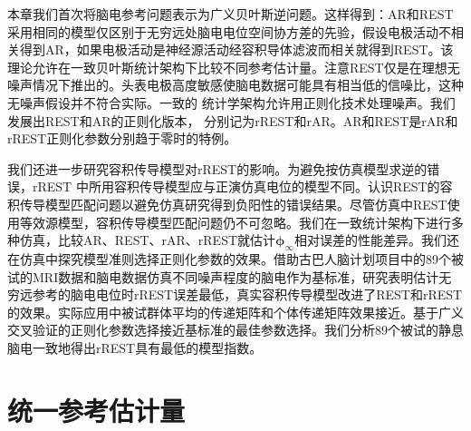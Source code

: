 本章我们首次将脑电参考问题表示为广义贝叶斯逆问题。这样得到：AR和REST采用相同的模型仅区别于无穷远处脑电电位空间协方差的先验，假设电极活动不相关得到AR，如果电极活动是神经源活动经容积导体滤波而相关就得到REST。该理论允许在一致贝叶斯统计架构下比较不同参考估计量。注意REST仅是在理想无噪声情况下推出的。头表电极高度敏感使脑电数据可能具有相当低的信噪比，这种无噪声假设并不符合实际。一致的
统计学架构允许用正则化技术处理噪声。我们发展出REST和AR的正则化版本，
分别记为rREST和rAR。AR和REST是rAR和rREST正则化参数分别趋于零时的特例。

我们还进一步研究容积传导模型对rREST的影响。为避免按仿真模型求逆的错误，rREST
中所用容积传导模型应与正演仿真电位的模型不同。认识REST的容积传导模型匹配问题以避免仿真研究得到负阳性的错误结果。尽管仿真中REST使用等效源模型，容积传导模型匹配问题仍不可忽略。我们在一致统计架构下进行多种仿真，比较AR、REST、rAR、rREST就估计$\mathbf{\phi}_\infty$相对误差的性能差异。我们还在仿真中探究模型准则选择正则化参数的效果。借助古巴人脑计划项目中的89个被试的MRI数据和脑电数据仿真不同噪声程度的脑电作为基标准，研究表明估计无穷远参考的脑电电位时rREST误差最低，真实容积传导模型改进了REST和rREST的效果。实际应用中被试群体平均的传递矩阵和个体传递矩阵效果接近。基于广义交叉验证的正则化参数选择接近基标准的最佳参数选择。我们分析89个被试的静息脑电一致地得出rREST具有最低的模型指数。

\section{统一参考估计量}
